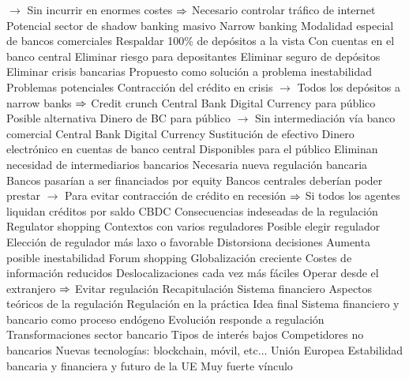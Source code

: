 \documentclass{nuevotema}
\begin{document}
\begin{esquemal}
				\4[] $\to$ Sin incurrir en enormes costes
				\4[] $\then$ Necesario controlar tráfico de internet
				\4 Potencial sector de shadow banking masivo
			\3 Narrow banking
				\4 Modalidad especial de bancos comerciales
				\4 Respaldar 100\% de depósitos a la vista
				\4[] Con cuentas en el banco central
				\4 Eliminar riesgo para depositantes
				\4 Eliminar seguro de depósitos
				\4 Eliminar crisis bancarias
				\4 Propuesto como solución a problema inestabilidad
				\4 Problemas potenciales
				\4[] Contracción del crédito en crisis
				\4[] $\to$ Todos los depósitos a narrow banks
				\4[] $\then$ Credit crunch
				\4 Central Bank Digital Currency para público
				\4[] Posible alternativa
				\4[] Dinero de BC para público
				\4[] $\to$ Sin intermediación vía banco comercial
			\3 Central Bank Digital Currency
				\4 Sustitución de efectivo
				\4 Dinero electrónico en cuentas de banco central
				\4 Disponibles para el público
				\4 Eliminan necesidad de intermediarios bancarios
				\4 Necesaria nueva regulación bancaria
				\4[] Bancos pasarían a ser financiados por equity
				\4[] Bancos centrales deberían poder prestar
				\4[] $\to$ Para evitar contracción de crédito en recesión
				\4[] $\then$ Si todos los agentes liquidan créditos por saldo CBDC
			\3 Consecuencias indeseadas de la regulación
			\3 Regulator shopping
				\4 Contextos con varios reguladores
				\4 Posible elegir regulador
				\4 Elección de regulador más laxo o favorable
				\4[$\then$] Distorsiona decisiones
				\4[$\then$] Aumenta posible inestabilidad
			\3 Forum shopping
				\4 Globalización creciente
				\4 Costes de información reducidos
				\4 Deslocalizaciones cada vez más fáciles
				\4 Operar desde el extranjero
				\4[] $\then$ Evitar regulación
	\1[] 
		\2 Recapitulación
			\3 Sistema financiero
			\3 Aspectos teóricos de la regulación
			\3 Regulación en la práctica
		\2 Idea final
			\3 Sistema financiero y bancario como proceso endógeno
				\4 Evolución responde a regulación
			\3 Transformaciones sector bancario
				\4 Tipos de interés bajos
				\4 Competidores no bancarios
				\4 Nuevas tecnologías: blockchain, móvil, etc...
			\3 Unión Europea
				\4 Estabilidad bancaria y financiera y futuro de la UE
				\4 Muy fuerte vínculo
\end{esquemal}
\end{document}
